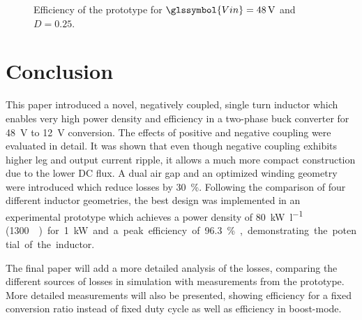 \documentclass[a4paper]{IPEC2026}
\newcommand{\sbl}[1]{\glssymbol{#1}}
\begin{document}
\begin{figure}
  \centering
  
  \caption{Efficiency of the prototype for $\sbl{Vin}=\qty{48}{\V}$ and $D=0.25$.}
  \label{fig:Efficiency}
\end{figure}

\section{Conclusion}
This paper introduced a novel, negatively coupled, single turn inductor which enables very high power density and efficiency in a two-phase buck converter for \qty{48}{\V} to \qty{12}{\V} conversion. The effects of positive and negative coupling were evaluated in detail. It was shown that even though negative coupling exhibits higher leg and output current ripple, it allows a much more compact construction due to the lower DC flux. A dual air gap and an optimized winding geometry were introduced which reduce losses by \qty{30}{\percent}. Following the comparison of four different inductor geometries, the best design was implemented in an experimental prototype which achieves a power density of \qty{80}{\kW\per\l} (\qty{1300}{\W\per\cubic\inch}) for \qty{1}{\kW} and a peak efficiency of \qty{96.3}{\percent}, demonstrating the potential of the inductor. \par
The final paper will add a more detailed analysis of the losses, comparing the different sources of losses in simulation with measurements from the prototype. More detailed measurements will also be presented, showing efficiency for a fixed conversion ratio instead of fixed duty cycle as well as efficiency in boost-mode. 



\end{document}
